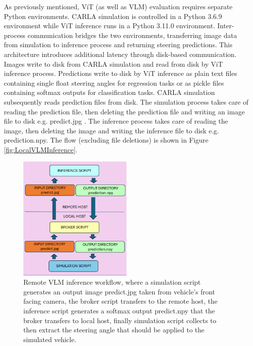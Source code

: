 As previously mentioned, ViT (as well as VLM) evaluation requires separate Python environments. CARLA simulation is controlled in a Python 3.6.9 environment while ViT inference runs in a Python 3.11.0 environment. Inter-process communication bridges the two environments, transferring image data from simulation to inference process and returning steering predictions. This architecture introduces additional latency through disk-based communication. Images write to disk from CARLA simulation and read from disk by ViT inference process. Predictions write to disk by ViT inference as plain text files containing single float steering angles for regression tasks or as pickle files containing softmax outputs for classification tasks. CARLA simulation subsequently reads prediction files from disk. The simulation process takes care of reading the prediction file, then deleting the prediction file and writing an image file to disk e.g. predict.jpg . The inference process takes care of reading the image, then deleting the image and writing the inference file to disk e.g. prediction.npy. The flow (excluding file deletions) is shown in Figure \ref{fig:LocalVLMInference}.

\begin{figure}[h]
\centering
\includegraphics[width=0.50\textwidth]{Figures/Methods/RemoteVLMInference.png}
\caption{Remote VLM inference workflow, where a simulation script generates an output image predict.jpg taken from vehicle's front facing camera, the broker script transfers to the remote host, the inference script generates a softmax output predict.npy that the broker transfers to local host, finally simulation script collects to then extract the steering angle that should be applied to the simulated vehicle.}
\label{fig:RemoteVLMInference}
\end{figure}

